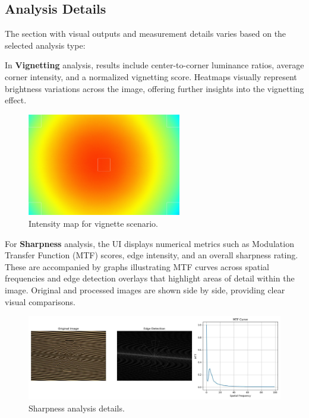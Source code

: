 \subsection{Analysis Details}

The section with visual outputs and measurement details varies based on the selected analysis type:

In \textbf{Vignetting} analysis, results include center-to-corner luminance ratios, average corner intensity, and a normalized vignetting score. Heatmaps visually represent brightness variations across the image, offering further insights into the vignetting effect.

\begin{figure}[hbt]
\centering
\includegraphics[width=0.6\textwidth]{Images/vignette_image_result.jpg}
\caption{Intensity map for vignette scenario.}
\label{fig:ui_vignette_intensity_map}
\end{figure}

For \textbf{Sharpness} analysis, the UI displays numerical metrics such as Modulation Transfer Function (MTF) scores, edge intensity, and an overall sharpness rating. These are accompanied by graphs illustrating MTF curves across spatial frequencies and edge detection overlays that highlight areas of detail within the image. Original and processed images are shown side by side, providing clear visual comparisons.

\begin{figure}[h]
\centering
\includegraphics[width=1\textwidth]{Images/sharpness_image_result.jpg}
\caption{Sharpness analysis details.}
\label{fig:ui_sharpness_image}
\end{figure}

